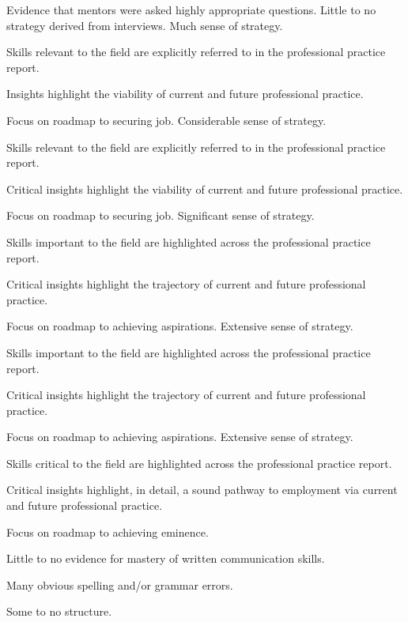 \documentclass{../../fal_assignment}
\begin{document}
\begin{markingrubric}
        \par 		Evidence that mentors were asked highly appropriate questions.
%
        \grade  \fail	Little to no strategy derived from interviews.
        \grade 		Much sense of strategy.
            \par 		Skills relevant to the field are explicitly referred to in the professional practice report.
        \par 		Insights highlight the viability of current and future professional practice.
            \par 		Focus on roadmap to securing job.
        \grade 		Considerable sense of strategy.
            \par 		Skills relevant to the field are explicitly referred to in the professional practice report.
        \par 		Critical insights highlight the viability of current and future professional practice.
            \par 		Focus on roadmap to securing job.
        \grade 		Significant sense of strategy.
            \par 		Skills important to the field are highlighted across the professional practice report.
        \par 		Critical insights highlight the trajectory of current and future professional practice.
            \par 		Focus on roadmap to achieving aspirations.
        \grade 		Extensive sense of strategy.
            \par 		Skills important to the field are highlighted across the professional practice report.
        \par 		Critical insights highlight the trajectory of current and future professional practice.            
            \par 		Focus on roadmap to achieving aspirations.
        \grade 		Extensive sense of strategy.
            \par 		Skills critical to the field are highlighted across the professional practice report.
        \par 		Critical insights highlight, in detail, a sound pathway to employment via current and future professional practice.
            \par 		Focus on roadmap to achieving eminence.
%
    
        \grade  \fail	Little to no evidence for mastery of written communication skills.
        \par 		Many obvious spelling and/or grammar errors.
        \par 		Some to no structure.
        

\end{markingrubric}
\end{document}
